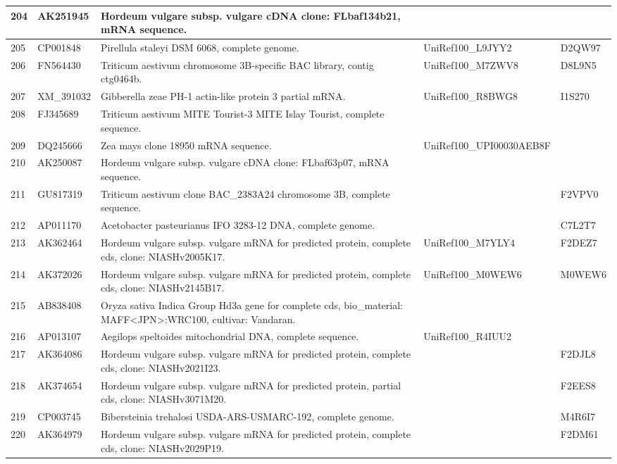 \documentclass[10.9pt]{article} %
\begin{document}
{\begin{longtable}{|p{1.3cm}|p{1.8cm}|p{6.2cm}|p{3.8cm}|p{2cm}|}
\hline
204 & AK251945 & Hordeum vulgare subsp. vulgare cDNA clone: FLbaf134b21, mRNA sequence. &  & \\
\hline
205 & CP001848 & Pirellula staleyi DSM 6068, complete genome. & UniRef100\_L9JYY2 & D2QW97\\
\hline
206 & FN564430 & Triticum aestivum chromosome 3B-specific BAC library, contig ctg0464b. & UniRef100\_M7ZWV8 & D8L9N5\\
\hline
207 & XM\_391032 & Gibberella zeae PH-1 actin-like protein 3 partial mRNA. & UniRef100\_R8BWG8 & I1S270\\
\hline
208 & FJ345689 & Triticum aestivum MITE Tourist-3 MITE Islay Tourist, complete sequence. &  & \\
\hline
209 & DQ245666 & Zea mays clone 18950 mRNA sequence. & UniRef100\_UPI00030AEB8F & \\
\hline
210 & AK250087 & Hordeum vulgare subsp. vulgare cDNA clone: FLbaf63p07, mRNA sequence. &  & \\
\hline
211 & GU817319 & Triticum aestivum clone BAC\_2383A24 chromosome 3B, complete sequence. &  & F2VPV0\\
\hline
212 & AP011170 & Acetobacter pasteurianus IFO 3283-12 DNA, complete genome. &  & C7L2T7\\
\hline
213 & AK362464 & Hordeum vulgare subsp. vulgare mRNA for predicted protein, complete cds, clone: NIASHv2005K17. & UniRef100\_M7YLY4 & F2DEZ7\\
\hline
214 & AK372026 & Hordeum vulgare subsp. vulgare mRNA for predicted protein, complete cds, clone: NIASHv2145B17. & UniRef100\_M0WEW6 & M0WEW6\\
\hline
215 & AB838408 & Oryza sativa Indica Group Hd3a gene for complete cds, bio\_material: MAFF<JPN>:WRC100, cultivar: Vandaran. &  & \\
\hline
216 & AP013107 & Aegilops speltoides mitochondrial DNA, complete sequence. & UniRef100\_R4IUU2 & \\
\hline
217 & AK364086 & Hordeum vulgare subsp. vulgare mRNA for predicted protein, complete cds, clone: NIASHv2021I23. &  & F2DJL8\\
\hline
218 & AK374654 & Hordeum vulgare subsp. vulgare mRNA for predicted protein, partial cds, clone: NIASHv3071M20. &  & F2EES8\\
\hline
219 & CP003745 & Bibersteinia trehalosi USDA-ARS-USMARC-192, complete genome. &  & M4R6I7\\
\hline
220 & AK364979 & Hordeum vulgare subsp. vulgare mRNA for predicted protein, complete cds, clone: NIASHv2029P19. &  & F2DM61\\

\end{longtable}}
\end{document}
